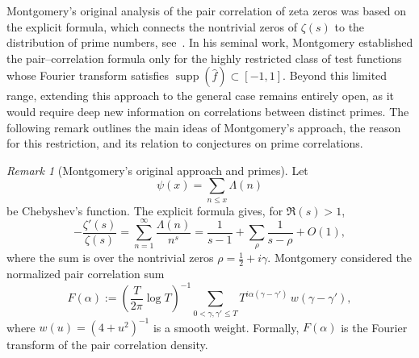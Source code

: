 \documentclass[12pt,reqno]{amsart}
\theoremstyle{plain}
\theoremstyle{definition}
\theoremstyle{remark}
\newtheorem{rem}{Remark}[section]       %
\begin{document}
Montgomery's original analysis of the pair correlation of zeta zeros
was based on the explicit formula, which connects the nontrivial zeros of 
$\zeta(s)$ to the distribution of prime numbers, see~\cite{M}.
In his seminal work, Montgomery established the pair--correlation formula
only for the highly restricted class of test functions whose Fourier transform
satisfies $\operatorname{supp}(\widehat{f})\subset[-1,1]$.
Beyond this limited range, extending this approach to the general case remains entirely open,
as it would require deep new information on correlations between distinct primes.
The following remark outlines the main ideas of Montgomery's approach,
the reason for this restriction, and its relation to conjectures on prime correlations.


\begin{rem}[Montgomery's original approach and primes] 
\label{rem:Mont}
Let 
\begin{equation}
\psi(x)=\sum_{n\le x}\Lambda(n)
\end{equation}
be Chebyshev’s function.
The explicit formula gives, for $\Re(s)>1$,
\begin{equation}\label{eq:explicit-formula}
-\frac{\zeta'(s)}{\zeta(s)}
= \sum_{n=1}^{\infty}\frac{\Lambda(n)}{n^s}
= \frac{1}{s-1} + \sum_{\rho}\frac{1}{s-\rho} + O(1),
\end{equation}
where the sum is over the nontrivial zeros $\rho=\tfrac{1}{2}+i\gamma$.
Montgomery considered the normalized pair correlation sum
\begin{equation}\label{eq:Montgomery-PC}
F(\alpha)
:= \left(\frac{T}{2\pi}\log T\right)^{-1}
\sum_{0<\gamma,\gamma'\le T}
T^{i\alpha(\gamma-\gamma')}
\,w(\gamma-\gamma'),
\end{equation}
where $w(u)=(4+u^2)^{-1}$ is a smooth weight.
Formally, $F(\alpha)$ is the Fourier transform of the pair correlation density.


\end{rem}
\end{document}
